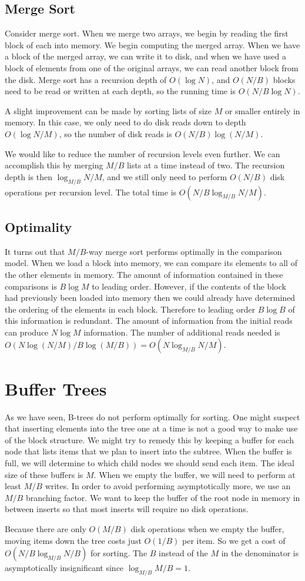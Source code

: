 \documentclass{article}
\begin{document}
\subsection{Merge Sort}
Consider merge sort.  When we merge two arrays, we
begin by reading the first block of each into memory.
We begin computing the merged array.  When we have a block
of the merged array, we can write it to disk, and when we have used a block of elements from one of the original arrays, we can read another block from the disk.  Merge sort has a recursion depth of $O(\log N)$, and $O(N/B)$ blocks need to be read or written at each depth, so the running time is $O(N/B \log N)$.

A slight improvement can be made by sorting lists of size
$M$ or smaller entirely in memory.  In this case, we only need to do disk reads down to depth $O(\log N/M)$, so
the number of disk reads is $O(N/B) \log (N/M)$.

We would like to reduce the number of recursion levels
even further.  We can accomplish this by merging $M/B$ lists
at a time instead of two.  The recursion depth is then
$\log_{M/B} N/M$, and we still only need to perform
$O(N/B)$ disk operations per recursion level.  The total time
is $O(N/B \log_{M/B} N/M)$.

\subsection{Optimality}
It turns out that $M/B$-way merge sort performs optimally in the comparison model.
When we load a block into memory, we can compare its
elements to all of the other elements in memory.  The
amount of information contained in these comparisons
is $B \log M$ to leading order.  However, if the contents
of the block had previously been loaded into memory then
we could already have determined the ordering of the
elements in each block.  Therefore to leading order
$B \log B$ of this information is redundant.  The amount of information from the initial reads can produce $N \log M$ information.  The number of additional reads needed is
$O(N \log (N/M) / B \log (M/B)) = O(N \log_{M/B} N/M)$.

\section{Buffer Trees}
As we have seen, B-trees do not perform optimally for sorting.  One might suspect that inserting elements into
the tree one at a time is not a good way to make use
of the block structure.  We might try to remedy this by keeping a buffer for each node that lists items that
we plan to insert into the subtree.  When the buffer is
full, we will determine to which child nodes we should send
each item.  The ideal size of these buffers is $M$.
When we empty the buffer, we will need to perform at least $M/B$ writes.  In order to avoid performing asymptotically
more, we use an $M/B$ branching factor.  We want to keep
the buffer of the root node in memory in between inserts so
that most inserts will require no disk operations.

Because there are only $O(M/B)$ disk operations when we empty the buffer, moving items down the tree costs just
$O(1/B)$ per item.  So we get a cost of
$O(N/B \log_{M/B} N/B)$ for sorting.  The $B$ instead of
the $M$ in the denominator is asymptotically insignificant
since $\log_{M/B} M/B=1$.
\end{document}
